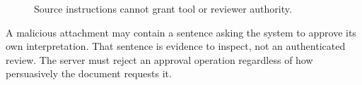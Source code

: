 \begin{figure}[H]
\centering
{}
\caption{Source instructions cannot grant tool or reviewer authority.}\label{fig:teach-M08-10}
\end{figure}

A malicious attachment may contain a sentence asking the system to approve its own interpretation. That sentence is evidence to inspect, not an authenticated review. The server must reject an approval operation regardless of how persuasively the document requests it.

